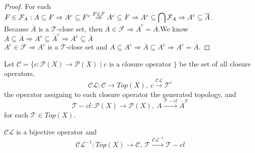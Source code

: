 \documentclass[a4paper,12pt]{report}
\begin{document}
\begin{proof}
For each $F\in \mathcal{F}_A: A \subseteq F \Rightarrow A^c \subseteq F^c \overset{ F\in \mathcal{F}}{\Rightarrow} A^c \subseteq F \\ \Rightarrow A^c \subseteq \displaystyle\bigcap \mathcal{F}_A \Rightarrow A^c \subseteq \overline{A}$. \\
Because $\overline{A}$ is a $\mathcal{T}$-close set, then $\overline{A} \in \mathcal{F} \Rightarrow \overline{A}^c = \overline{A}.$We know $A \subseteq \overline{A} \Rightarrow A^c \subseteq \overline{A}^c \Rightarrow A^c \subseteq \overline{A}$ \\
$A^c \in \mathcal{F} \Rightarrow A^c$ is a $\mathcal{T}$-close set and $A\subseteq A^c \Rightarrow \overline{A} \subseteq A^c \Rightarrow A^c = \overline{A}$.
 
\end{proof}


\md
{
\quad Let $\mathcal{C} = \{c: \mathcal{P}(X) \to \mathcal{P}(X) \;|\; c \text{ is a closure operator } \}$ be the set of all closure operators, \[ \mathcal{CL}: \mathcal{C} \to Top(X),\: c \overset{\mathcal{CL}}{\longrightarrow} \mathcal{T}^c \] the operator assigning to each closure operator the generated topology, and \[ \mathcal{T}-cl: \mathcal{P}(X) \to \mathcal{P}(X), \: A \overset{\mathcal{T}-cl}{\longrightarrow} \overline{A}^{\mathcal{T}}\] for each $\mathcal{T} \in Top(X).$
}

\mth
{
\quad $\mathcal{CL}$ is a bijective operator and \[\mathcal{CL}^{-1}: Top(X)\to \mathcal{C}, \: \mathcal{T} \overset{\mathcal{CL}^{-1}}{\longrightarrow} \mathcal{T}-cl\]
}
\end{document}
